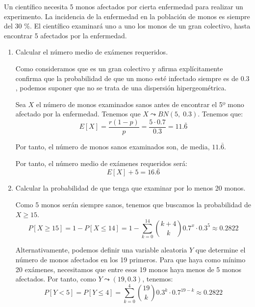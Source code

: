 \begin{ejercicio}
    Un científico necesita 5 monos afectados por cierta enfermedad para realizar un experimento. La incidencia de la enfermedad en la población de monos es siempre del 30 \%. El científico examinará uno a uno los monos de un gran colectivo, hasta encontrar 5 afectados por la enfermedad.
    \begin{enumerate}
        \item Calcular el número medio de exámenes requeridos.

        Como consideramos que es un gran colectivo y afirma explícitamente confirma que la probabilidad de que un mono esté infectado siempre es de $0.3$, podemos suponer que no se trata de una dispersión hipergeométrica.

        Sea $X$ el número de monos examinados sanos antes de encontrar el 5º mono afectado por la enfermedad. Tenemos que $X\leadsto BN(5,\;0.3)$. Tenemos que:
        \begin{equation*}
            E[X]=\frac{r(1-p)}{p}=\frac{5\cdot 0.7}{0.3} = 11.\bar{6}
        \end{equation*}

        Por tanto, el número de monos sanos examinados son, de media, $11.\bar{6}$.

        Por tanto, el número medio de exámenes requeridos será:
        \begin{equation*}
            E[X]+5 = 16.\bar{6}
        \end{equation*}

        
        \item Calcular la probabilidad de que tenga que examinar por lo menos 20 monos.

        Como 5 monos serán siempre sanos, tenemos que buscamos la probabilidad de $X\geq 15$.
        \begin{equation*}
            P[X\geq 15] = 1-P[X\leq 14] = 1-\sum_{k=0}^{14} \binom{k+4}{k}0.7^{x}\cdot 0.3^5 \approx 0.2822
        \end{equation*}

        Alternativamente, podemos definir una variable aleatoria $Y$ que determine el número de monos afectados en los 19 primeros. Para que haya como mínimo 20 exámenes, necesitamos que entre esos 19 monos haya menos de 5 monos afectados. Por tanto, como $Y\leadsto (19, 0.3)$, tenemos:
        \begin{equation*}
            P[Y<5] = P[Y\leq 4] = \sum_{k=0}^4 \binom{19}{k}0.3^{k}\cdot 0.7^{19-k} \approx0.2822
        \end{equation*}
        

\end{enumerate}
\end{ejercicio}
